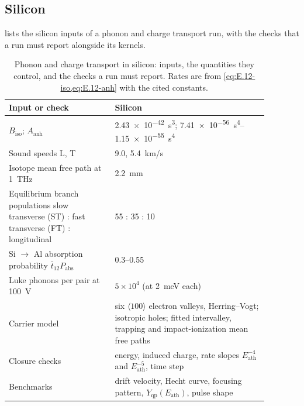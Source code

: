 \subsection{Silicon}

 lists the silicon inputs of a phonon and charge transport run, with the checks that a run must report alongside its kernels.

\begin{table}[t]
  \caption{Phonon and charge transport in silicon: inputs, the quantities they control, and the checks a run must report. Rates are from \cref{eq:E.12-iso,eq:E.12-anh} with the cited constants.}
  \label{tab:E-transport-si}
  \centering
  \begin{tabular}{p{0.36\linewidth}p{0.52\linewidth}}
    \toprule
    Input or check & Silicon \\
    \midrule
    $B_{\mathrm{iso}}$; $A_{\mathrm{anh}}$ & \SI{2.43e-42}{s^3}; \SIrange{7.41e-56}{1.15e-55}{s^4}~\cite{leman2012invited,hernandez2025modeling} \\
    Sound speeds L, T & 9.0, \SI{5.4}{km/s}~\cite{leman2012invited} \\
    Isotope mean free path at \SI{1}{THz} & \SI{2.2}{mm} \\
    Equilibrium branch populations slow transverse (ST) : fast transverse (FT) : longitudinal & 55 : 35 : 10~\cite{leman2012invited} \\
    Si $\to$ Al absorption probability $\bar t_{12}P_{\mathrm{abs}}$ & 0.3--0.55~\cite{martinez2019measurements} \\
    Luke phonons per pair at \SI{100}{V} & $5\times10^4$ (at \SI{2}{meV} each) \\
    Carrier model & six $\langle100\rangle$ electron valleys, Herring--Vogt; isotropic holes; fitted intervalley, trapping and impact-ionization mean free paths \\
    Closure checks & energy, induced charge, rate slopes $E_{\mathrm{ath}}^{-4}$ and $E_{\mathrm{ath}}^{-5}$, time step \\
    Benchmarks & drift velocity, Hecht curve, focusing pattern, $Y_{\mathrm{qp}}(E_{\mathrm{ath}})$, pulse shape \\
    \bottomrule
  \end{tabular}
\end{table}
